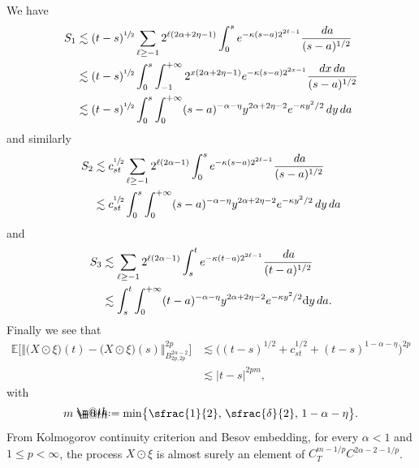 \documentclass[10pt]{amsart}
\makeatletter
\theoremstyle{definition}
\newcommand\bbE{\mathbb{E}}
\newcommand*{\defeq}{\mathrel{\rlap{%
\raisebox{0.3ex}{$\m@th\cdot$}}%
\raisebox{-0.3ex}{$\m@th\cdot$}}%
=}
\newcommand{\dd}{\textup{d}}
\makeatother
\begin{document}
We have
\begin{align*}
S_1&\lesssim (t-s)^{\sfrac{1}{2}}\sum_{\ell\geq -1} 2^{\ell(2\alpha+2\eta-1)} \int_0^s e^{-\kappa(s-a)2^{2\ell-1}}\frac{\,da}{(s-a)^{1/2}}
\\
&\lesssim (t-s)^{\sfrac{1}{2}}\int_0^s \int_{-1}^{+\infty} 2^{x(2\alpha+2\eta-1)}e^{-\kappa(s-a)2^{2x-1}}\frac{dx\,da}{(s-a)^{1/2}}
\\
&\lesssim (t-s)^{\sfrac{1}{2}} \int_0^s \int_0^{+\infty} (s-a)^{-\alpha-\eta} y^{2\alpha+2\eta-2}e^{-\kappa y^2/2} \,dy\,da
\end{align*}
and similarly
\begin{align*}
S_2&\lesssim c_{st}^{\sfrac{1}{2}}\sum_{\ell\geq -1} 2^{\ell(2\alpha-1)} \int_0^s e^{-\kappa(s-a)2^{2\ell-1}}\frac{\,da}{(s-a)^{1/2}}
\\
&\lesssim c_{st}^{\sfrac{1}{2}} \int_0^s \int_0^{+\infty} (s-a)^{-\alpha-\eta} y^{2\alpha+2\eta-2}e^{-\kappa y^2/2} \,dy\,da
\end{align*}
and
\begin{align*}
S_3&\lesssim \sum_{\ell\geq -1} 2^{\ell(2\alpha-1)} \int_s^t e^{-\kappa(t-a)2^{2\ell-1}}\frac{\,da}{(t-a)^{1/2}}
\\
&\lesssim \int_s^t \int_0^{+\infty} (t-a)^{-\alpha-\eta} y^{2\alpha+2\eta-2}e^{-\kappa y^2/2} \dd y\,da.
\end{align*}
Finally we see that
\begin{align*}
\bbE\bigl[\big\Vert\bigl(X\odot\xi\bigr)(t)-\bigl(X\odot\xi\bigr)(s)\big\Vert_{B^{2\alpha-2}_{2p,2p}}^{2p}\bigr]&\lesssim \bigl( (t-s)^{1/2}+c_{st}^{1/2}+(t-s)^{1-\alpha-\eta}\bigr)^{2p}
\\
&\lesssim |t-s|^{2pm},
\end{align*}
with
\[
m\defeq \min\bigl\{ \sfrac{1}{2}, \, \sfrac{\delta}{2},\, 1-\alpha-\eta\bigr\}.
\]
From Kolmogorov continuity criterion and Besov embedding, for every $\alpha<1$ and $1\leq p<\infty$, the process $X\odot\xi$ is almost surely an element of $C^{m-1/p}_TC^{2\alpha-2 - 1/p}$.
\end{document}

